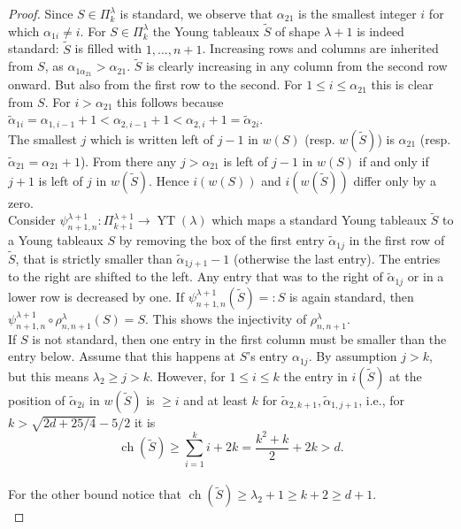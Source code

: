 \documentclass[11pt,a4paper]{amsart}
\numberwithin{equation}{section}
\theoremstyle{definition}
\DeclareMathOperator{\ch}{ch}
\DeclareMathOperator{\YT}{YT}
\numberwithin{thm}{section}
\theoremstyle{break}
\numberwithin{subcase}{case}
\begin{document}
\begin{proof}
Since $S \in \Pi_k^\lambda$ is standard, we observe that $\alpha_{21}$ is the smallest integer $i$ for which $\alpha_{1i} \neq i$. For ${S} \in \Pi_k^\lambda$ the Young tableaux $\widetilde{S}$ of shape $\lambda +1$ is indeed standard:  $\widetilde{S}$ is filled with $1,\ldots,n+1$. Increasing rows and columns are inherited from $S$, as $\alpha_{1 \alpha_{21}} > \alpha_{21}$. $\widetilde{S}$ is clearly increasing in any column from the second row onward. But also from the first row to the second. For $1 \leq i \leq \alpha_{21}$ this is clear from $S$. For $i > \alpha_{21}$ this follows because $\widetilde{\alpha}_{1i} = \alpha_{1,i-1} +1 < \alpha_{2,i-1} +1 < \alpha_{2,i}+1 = \widetilde{\alpha}_{2i}$. \\
The smallest $j$ which is written left of $j-1$ in $w(S)$ (resp. $w(\widetilde{S})$) is $\alpha_{21}$ (resp. $\widetilde{\alpha}_{21}=\alpha_{21}+1$). From there any $j> \alpha_{21}$ is left of $j-1$ in $w(S)$ if and only if $j+1$ is left of $j$ in $w(\widetilde{S})$. Hence $i(w(S))$ and $i(w(\widetilde{S}))$ differ only by a zero. \\
Consider $\psi_{n+1,n}^{\lambda+1} : \Pi_{k+1}^{\lambda +1} \rightarrow \YT (\lambda)$ which maps a standard Young tableaux $\widetilde{S}$ to a Young tableaux $S$  by removing the box of the first entry $\widetilde{\alpha}_{1j}$ in the first row of $\widetilde{S}$, that is strictly smaller than $\widetilde{\alpha}_{1j+1}-1$ (otherwise the last entry). The entries to the right are shifted to the left. Any entry that was to the right of $\widetilde{\alpha}_{1j}$ or in a lower row is decreased by one. If $\psi_{n+1,n}^{\lambda+1}(\widetilde{S})=:S$ is again standard, then $\psi_{n+1,n}^{\lambda+1} \circ \rho_{n,n+1}^\lambda(S) =S$. This shows the injectivity of $\rho_{n,n+1}^\lambda$. \\
If $S$ is not standard, then one entry in the first column must be smaller than the entry below. Assume that this happens at $S$'s entry $\alpha_{1j}$. By assumption $j > k$, but this means $\lambda_2 \geq j > k$. However, for $1 \leq i \leq k$ the entry in $i(\widetilde{S})$ at the position of $\widetilde{\alpha}_{2i}$ in $w(\widetilde{S})$ is $\geq i$ and at least $k$ for $\widetilde{\alpha}_{2,k+1},\widetilde{\alpha}_{1,j+1}$, i.e., for $k > \sqrt{2d+25/4}-5/2$ it is $$\ch (\widetilde{S}) \geq \sum_{i=1}^{k} i + 2k = \frac{k^2+k}{2}+2k > d.$$ \\ 
For the other bound notice that $\ch (\widetilde{S}) \geq \lambda_2 + 1 \geq k+2 \geq d+1$. \\

\end{proof}
\end{document}
